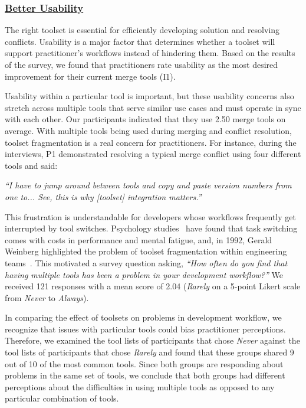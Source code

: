 \subsubsection{\underline{Better Usability}}
The right toolset is essential for efficiently developing solution and resolving conflicts.
Usability is a major factor that determines whether a toolset will support practitioner's workflows instead of hindering them.
Based on the results of the survey, we found that practitioners rate usability as the most desired improvement for their current merge tools (I1).

Usability within a particular tool is important, but these usability concerns also stretch across multiple tools that serve similar use cases and must operate in sync with each other.
Our participants indicated that they use 2.50 merge tools on average.
With multiple tools being used during merging and conflict resolution, toolset fragmentation is a real concern for practitioners.
For instance, during the interviews, P1 demonstrated resolving a typical merge conflict using four different tools and said: 
\begin{displayquote}
\textit{``I have to jump around between tools and copy and paste version numbers from one to... See, this is why [toolset] integration matters.''}
\end{displayquote}

This frustration is understandable for developers whose workflows frequently get interrupted by tool switches. Psychology studies~\cite{Meiran2000}\cite{gopher2000switching} have found that task switching comes with costs in performance and mental fatigue, and, in 1992, Gerald Weinberg highlighted the problem of toolset fragmentation within engineering teams~\cite{Weinberg1992}. 
This motivated a survey question asking, \textit{``How often do you find that having multiple tools has been a problem in your development workflow?''} We received 121 responses with a mean score of 2.04 (\textit{Rarely} on a 5-point Likert scale from \textit{Never} to \textit{Always}). 

In comparing the effect of toolsets on problems in development workflow, we recognize that issues with particular tools could bias practitioner perceptions.
Therefore, we examined the tool lists of participants that chose \textit{Never} against the tool lists of participants that chose \textit{Rarely} and found that these groups shared 9 out of 10 of the most common tools.
Since both groups are responding about problems in the same set of tools, we conclude that both groups had different perceptions about the difficulties in using multiple tools as opposed to any particular combination of tools.

